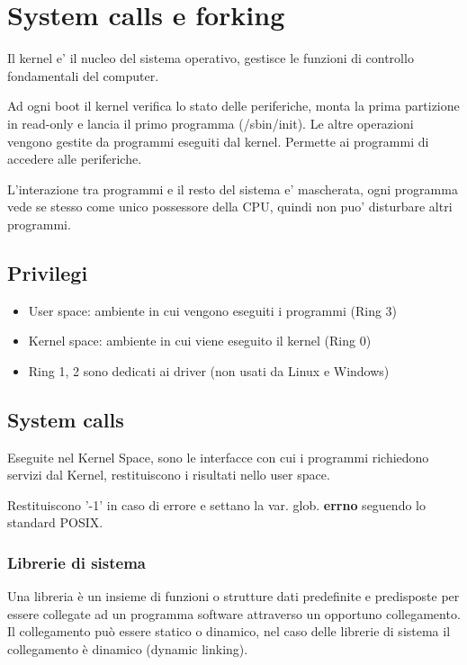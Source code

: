 \section{System calls e forking}
Il kernel e' il nucleo del sistema operativo, gestisce le funzioni di controllo fondamentali del computer. 

Ad ogni boot il kernel verifica lo stato delle periferiche, monta la prima partizione in read-only e lancia il primo programma (/sbin/init). Le altre operazioni vengono gestite da programmi eseguiti dal kernel. Permette ai programmi di accedere alle periferiche.

L'interazione tra programmi e il resto del sistema e' mascherata, ogni programma vede se stesso come unico possessore della CPU, quindi non puo' disturbare altri programmi.

\subsection{Privilegi}


\begin{itemize}
  \item User space: ambiente in cui vengono eseguiti i programmi (Ring 3)
  \item Kernel space: ambiente in cui viene eseguito il kernel (Ring 0)
  \item Ring 1, 2 sono dedicati ai driver (non usati da Linux e Windows)
\end{itemize}

\subsection{System calls}
Eseguite nel Kernel Space, sono le interfacce con cui i programmi richiedono servizi dal Kernel, restituiscono i risultati nello user space.

Restituiscono '-1' in caso di errore e settano la var. glob. \textbf{errno} seguendo lo standard POSIX.

\subsubsection{Librerie di sistema}
Una libreria è un insieme di funzioni o strutture dati predefinite e predisposte per essere collegate ad un programma software attraverso un opportuno collegamento. Il collegamento può essere statico o dinamico, nel caso delle librerie di sistema il collegamento è dinamico (dynamic linking).

